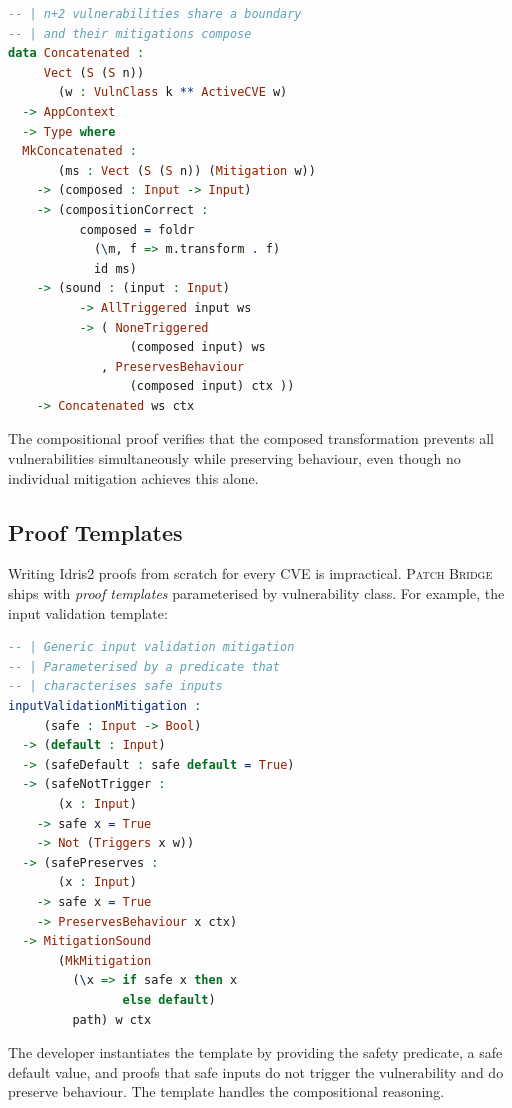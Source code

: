 \documentclass[11pt,twocolumn]{article}
\begin{document}
\begin{lstlisting}[language=Idris,caption={Concatenative mitigation proof},label=lst:idris-concat]
-- | n+2 vulnerabilities share a boundary
-- | and their mitigations compose
data Concatenated :
     Vect (S (S n))
       (w : VulnClass k ** ActiveCVE w)
  -> AppContext
  -> Type where
  MkConcatenated :
       (ms : Vect (S (S n)) (Mitigation w))
    -> (composed : Input -> Input)
    -> (compositionCorrect :
          composed = foldr
            (\m, f => m.transform . f)
            id ms)
    -> (sound : (input : Input)
          -> AllTriggered input ws
          -> ( NoneTriggered
                 (composed input) ws
             , PreservesBehaviour
                 (composed input) ctx ))
    -> Concatenated ws ctx
\end{lstlisting}

The compositional proof verifies that the composed transformation
prevents all vulnerabilities simultaneously while preserving behaviour,
even though no individual mitigation achieves this alone.

\subsection{Proof Templates}

Writing Idris2 proofs from scratch for every CVE is impractical.
\textsc{Patch Bridge} ships with \emph{proof templates} parameterised
by vulnerability class. For example, the input validation template:

\begin{lstlisting}[language=Idris,caption={Input validation proof template},label=lst:idris-template]
-- | Generic input validation mitigation
-- | Parameterised by a predicate that
-- | characterises safe inputs
inputValidationMitigation :
     (safe : Input -> Bool)
  -> (default : Input)
  -> (safeDefault : safe default = True)
  -> (safeNotTrigger :
       (x : Input)
    -> safe x = True
    -> Not (Triggers x w))
  -> (safePreserves :
       (x : Input)
    -> safe x = True
    -> PreservesBehaviour x ctx)
  -> MitigationSound
       (MkMitigation
         (\x => if safe x then x
                else default)
         path) w ctx
\end{lstlisting}

The developer instantiates the template by providing the safety
predicate, a safe default value, and proofs that safe inputs do not
trigger the vulnerability and do preserve behaviour. The template
handles the compositional reasoning.
\end{document}
